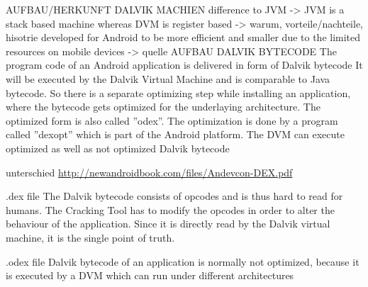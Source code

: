AUFBAU/HERKUNFT DALVIK MACHIEN\newline
difference to JVM -> JVM is a stack based machine whereas DVM is register based -> warum, vorteile/nachteile, hisotrie\newline
developed for Android to be more efficient and smaller due to the limited resources on mobile devices -> quelle\newline
AUFBAU DALVIK BYTECODE\newline
The program code of an Android application is delivered in form of Dalvik bytecode\newline
It will be executed by the Dalvik Virtual Machine and is comparable to Java bytecode. So there is a separate
optimizing step while installing an application, where the bytecode gets optimized for the underlaying architecture. The optimized form is also called ”odex”. The optimization is done by a program called ”dexopt” which is part of the Android platform. The DVM can execute optimized as well as not optimized Dalvik bytecode\newline

unterschied \url{http://newandroidbook.com/files/Andevcon-DEX.pdf}\newline

.dex file
The Dalvik bytecode consists of opcodes and is thus hard to read for humans. The Cracking Tool has to modify the opcodes in order to alter the behaviour of the application. Since it is directly read by the Dalvik virtual machine, it is the single point of truth.\newline

.odex file
Dalvik bytecode of an application is normally not optimized, because it is executed by a DVM which can run under different architectures\newline
